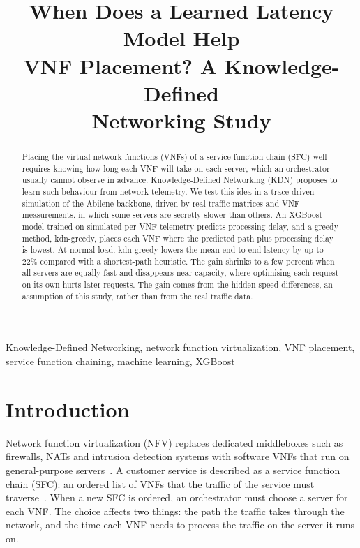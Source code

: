 \documentclass[conference,a4paper]{IEEEtran}
\begin{document}
\title{When Does a Learned Latency Model Help\\VNF Placement? A Knowledge-Defined\\Networking Study}

\author{
}

\maketitle

\begin{abstract}
Placing the virtual network functions (VNFs) of a service function chain (SFC) well requires knowing how long each
VNF will take on each server, which an orchestrator usually cannot observe in advance. Knowledge-Defined Networking
(KDN) proposes to learn such behaviour from network telemetry. We test this idea in a trace-driven simulation of the
Abilene backbone, driven by real traffic matrices and VNF measurements, in which some servers are secretly slower
than others. An XGBoost model trained on simulated per-VNF telemetry predicts processing delay, and a greedy method,
kdn-greedy, places each VNF where the predicted path plus processing delay is lowest. At normal load, kdn-greedy
lowers the mean end-to-end latency by up to 22\% compared with a shortest-path heuristic. The gain shrinks to a few
percent when all servers are equally fast and disappears near capacity, where optimising each request on its own
hurts later requests. The gain comes from the hidden speed differences, an assumption of this study, rather than
from the real traffic data.
\end{abstract}

\begin{IEEEkeywords}
Knowledge-Defined Networking, network function virtualization, VNF placement, service function chaining, machine
learning, XGBoost
\end{IEEEkeywords}

\section{Introduction}
Network function virtualization (NFV) replaces dedicated middleboxes such as firewalls, NATs and intrusion
detection systems with software VNFs that run on general-purpose servers~\cite{mijumbi2016nfv}. A customer service
is described as a service function chain (SFC): an ordered list of VNFs that the traffic of the service must
traverse~\cite{rfc7665}. When a new SFC is ordered, an orchestrator must choose a server for each VNF. The choice
affects two things: the path the traffic takes through the network, and the time each VNF needs to process the
traffic on the server it runs on.
\end{document}
